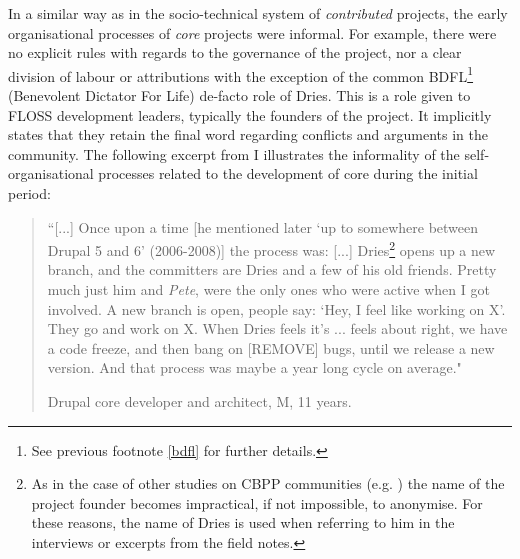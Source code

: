 In a similar way as in the socio-technical system of \textit{contributed} projects, the early organisational processes of \textit{core} projects were informal. For example, there were no explicit rules with regards to the governance of the project, nor a clear division of labour or attributions with the exception of the common BDFL\footnote{See previous footnote \ref{bdfl} for further details.} (Benevolent Dictator For Life) de-facto role of Dries. This is a role given to FLOSS development leaders, typically the founders of the project. It implicitly states that they retain the final word regarding conflicts and arguments in the community. The following excerpt from I illustrates the informality of the self-organisational processes related to the development of core during the initial period:

\begin{quotation}
``[...] Once upon a time [he mentioned later `up to somewhere between Drupal 5 and 6' (2006-2008)] the process was: [...] Dries\footnote{As in the case of other studies on CBPP communities (e.g. \textcite{forte2009decentralization}) the name of the project founder becomes impractical, if not impossible, to anonymise. For these reasons, the name of Dries is used when referring to him in the interviews or excerpts from the field notes.} opens up a new branch, and the committers are Dries and a few of his old friends. Pretty much just him and \textit{Pete}, were the only ones who were active when I got involved. A new branch is open, people say: `Hey, I feel like working on X'. They go and work on X. When Dries feels it's ... feels about right, we have a code freeze, and then bang on [REMOVE] bugs, until we release a new version. And that process was maybe a year long cycle on average."
\begin{flushright}\footnotesize{Drupal core developer and architect, M, 11 years.}\end{flushright}
\end{quotation}

